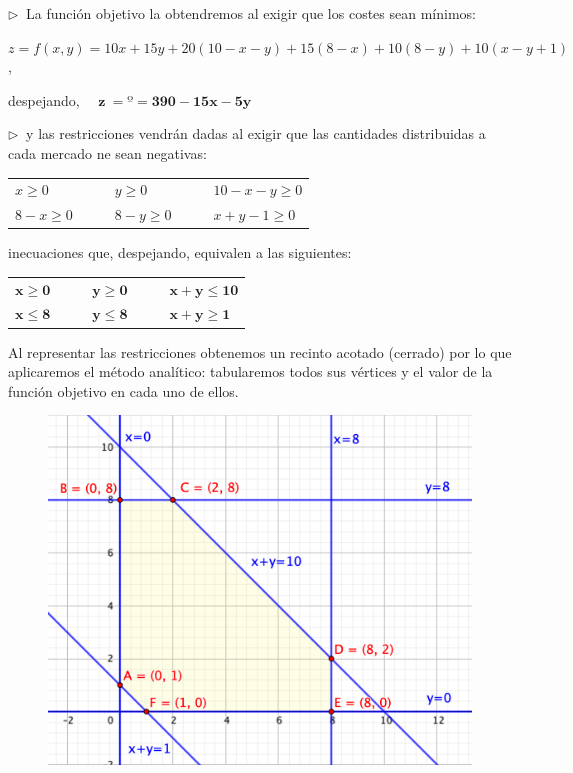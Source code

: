 $\triangleright \ $ La función objetivo la obtendremos al exigir que los costes sean mínimos:

$z = {f(x,y)=10x+15y+20(10-x-y)+15(8-x)+10(8-y)+10(x-y+1)} $,

despejando, $\quad \boldsymbol{z \ = º \boldsymbol{=390-15x-5y}  }$

$\triangleright \ $ y las restricciones vendrán dadas al exigir que las cantidades distribuidas a cada mercado ne sean negativas:

\begin{table}[H]
\centering
\begin{tabular}{lllll}
$x\ge 0$ & $\quad$ & $y\ge 0$ & $\quad$ & $10-x-y\ge 0$ \\
$8-x\ge 0$ &  & $8-y\ge 0$ &  & $x+y-1\ge 0$
\end{tabular}
\end{table}

inecuaciones que, despejando, equivalen a las siguientes:


\begin{table}[H]
\centering
\begin{tabular}{lllll}
$\boldsymbol{x\ge 0}$ & $\quad$ & $\boldsymbol{y\ge 0}$ & $\quad$ & $\boldsymbol{x+y\le 10}$ \\
$\boldsymbol{x\le 8}$ &  & $\boldsymbol{y\le 8}$ &  & $\boldsymbol{x+y\ge 1}$
\end{tabular}
\end{table}

Al representar las restricciones obtenemos un recinto acotado (cerrado) por lo que aplicaremos el método analítico: tabularemos todos sus vértices y el valor de la función objetivo en cada uno de ellos.

\vspace{3mm}
\begin{figure}[H]
	\centering
	\includegraphics[width=.7\textwidth]{imagenes/img25.png}
\end{figure}
\vspace{3mm}

